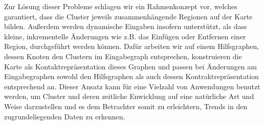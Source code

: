 \begin{addmargin}{0.5cm}
Zur Lösung dieser Probleme schlagen wir ein Rahmenkonzept vor, welches garantiert, dass die Cluster jeweils zusammenhängende Regionen auf der Karte bilden.
Außerdem werden dynamische Eingaben insofern unterstützt, als dass kleine, inkrementelle Änderungen wie z.B. das Einfügen oder Entfernen einer Region, durchgeführt werden können.
Dafür arbeiten wir auf einem Hilfsgraphen, dessen Knoten den Clustern im Eingabegraph entsprechen, konstruieren die Karte als Kontaktrepräsentation dieses Graphen und passen bei Änderungen am Eingabegraphen sowohl den Hilfsgraphen als auch dessen Kontraktrepräsentation entsprechend an.
Dieser Ansatz kann für eine Vielzahl von Anwendungen benutzt werden, um Cluster und deren zeitliche Enwicklung auf eine natürliche Art und Weise darzustellen und es dem Betrachter somit zu erleichtern, Trends in den zugrundeliegenden Daten zu erkennen.

\end{addmargin}
